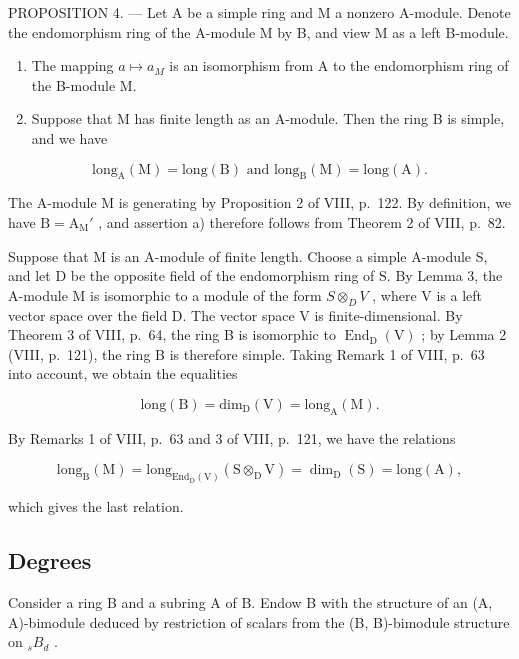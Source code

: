 PROPOSITION 4. --- Let A be a simple ring and M a nonzero A-module. Denote the endomorphism ring of the A-module M by B, and view M as a left B-module.

\begin{enumerate}
\def\labelenumi{\alph{enumi})}
\item
  The mapping \(a \mapsto a_{M}\) is an isomorphism from A to the endomorphism ring of the B-module M.
\item
  Suppose that M has finite length as an A-module. Then the ring B is simple, and we have
\end{enumerate}

\[
\mathrm{long} _ {\mathrm{A}} (\mathrm{M}) = \mathrm{long} (\mathrm{B}) \text{ and } \mathrm{long} _ {\mathrm{B}} (\mathrm{M}) = \mathrm{long} (\mathrm{A}).\tag{2}
\]

The A-module M is generating by Proposition 2 of VIII, p.~122. By definition, we have \(\mathrm{B} = \mathrm{A}_{\mathrm{M}}'\) , and assertion a) therefore follows from Theorem 2 of VIII, p.~82.

Suppose that M is an A-module of finite length. Choose a simple A-module S, and let D be the opposite field of the endomorphism ring of S. By Lemma 3, the A-module M is isomorphic to a module of the form \(S \otimes_{D} V\) , where V is a left vector space over the field D. The vector space V is finite-dimensional. By Theorem 3 of VIII, p.~64, the ring B is isomorphic to \(\operatorname{End}_{\mathrm{D}}(\mathrm{V})\) ; by Lemma 2 (VIII, p.~121), the ring B is therefore simple. Taking Remark 1 of VIII, p.~63 into account, we obtain the equalities

\[
\mathrm{long(B)} = \mathrm {dim_ {D} (V)} = \mathrm {long_ {A} (M)}.
\]

By Remarks 1 of VIII, p.~63 and 3 of VIII, p.~121, we have the relations

\[
\mathrm{long} _ {\mathrm{B}} (\mathrm{M}) = \mathrm{long} _ {\mathrm{End} _ {\mathrm{D}} (\mathrm{V})} (\mathrm{S} \otimes_ {\mathrm{D}} \mathrm{V}) = \dim_ {\mathrm{D}} (\mathrm{S}) = \mathrm{long} (\mathrm{A}),
\]

which gives the last relation.

\subsection{Degrees}

Consider a ring B and a subring A of B. Endow B with the structure of an (A, A)-bimodule deduced by restriction of scalars from the (B, B)-bimodule structure on \(_{s}B_{d}\) .

